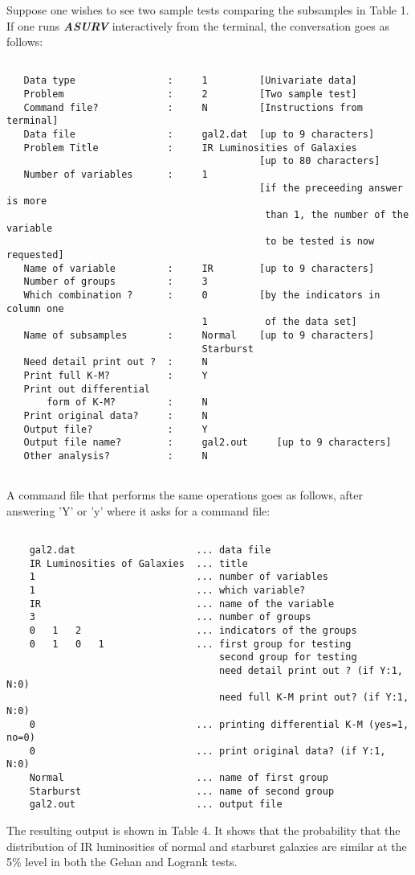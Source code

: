        Suppose one wishes to see two sample tests comparing the  subsamples
  in Table 1. If one runs {\sl\bf ASURV} interactively from the terminal, the
  conversation goes as follows:
\begin{verbatim}  

   Data type                :     1         [Univariate data]
   Problem                  :     2         [Two sample test]
   Command file?            :     N         [Instructions from terminal]
   Data file                :     gal2.dat  [up to 9 characters]
   Problem Title            :     IR Luminosities of Galaxies
                                            [up to 80 characters]
   Number of variables      :     1 
                                            [if the preceeding answer is more
                                             than 1, the number of the variable
                                             to be tested is now requested]
   Name of variable         :     IR        [up to 9 characters]
   Number of groups         :     3
   Which combination ?      :     0         [by the indicators in column one 
                                  1          of the data set]
   Name of subsamples       :     Normal    [up to 9 characters]
                                  Starburst 
   Need detail print out ?  :     N
   Print full K-M?          :     Y 
   Print out differential
       form of K-M?         :     N
   Print original data?     :     N
   Output file?             :     Y
   Output file name?        :     gal2.out     [up to 9 characters]
   Other analysis?          :     N
 
\end{verbatim}
A command file that performs the same operations goes as follows, after 
answering 'Y' or 'y' where it asks for a command file:
\begin{verbatim}
 
    gal2.dat                     ... data file                   
    IR Luminosities of Galaxies  ... title                      
    1                            ... number of variables      
    1                            ... which variable?         
    IR                           ... name of the variable   
    3                            ... number of groups        
    0   1   2                    ... indicators of the groups   
    0   1   0   1                ... first group for testing 
                                     second group for testing
                                     need detail print out ? (if Y:1, N:0)
                                     need full K-M print out? (if Y:1, N:0)
    0                            ... printing differential K-M (yes=1, no=0)
    0                            ... print original data? (if Y:1, N:0)
    Normal                       ... name of first group    
    Starburst                    ... name of second group        
    gal2.out                     ... output file               
\end{verbatim} 
     The resulting output is shown in Table 4. It shows that the
probability that the distribution of IR luminosities of normal and 
starburst galaxies are similar at the 5\% level in both the Gehan and Logrank 
tests.

